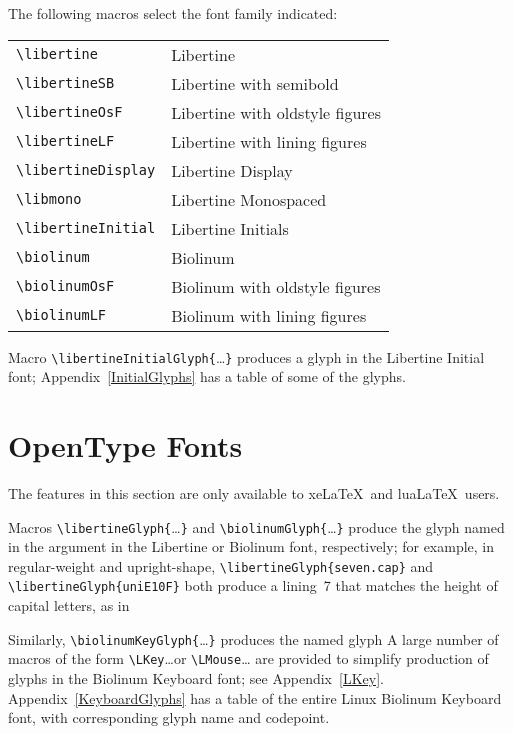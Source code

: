 \documentclass[11pt]{article}
\begin{document}
The following macros select the font family indicated:
\begin{center}
\begin{tabular}{ll}
\verb|\libertine| & Libertine \\
\verb|\libertineSB|& Libertine with semibold \\
\verb|\libertineOsF| & Libertine with oldstyle figures \\
\verb|\libertineLF| & Libertine with lining figures \\
\verb|\libertineDisplay| & Libertine Display \\
\verb|\libmono| & Libertine Monospaced \\
\verb|\libertineInitial| & Libertine Initials \\
\verb|\biolinum| & Biolinum \\
\verb|\biolinumOsF|& Biolinum with oldstyle figures \\
\verb|\biolinumLF| & Biolinum with lining figures \\
\end{tabular}
\end{center}
Macro \verb|\libertineInitialGlyph{|\ldots\verb|}| produces a glyph in the Libertine Initial font;
Appendix~\ref{InitialGlyphs} has a table of some of the glyphs.

\section{OpenType Fonts}
\label{OpenType}

The features in this section are only available to xe\LaTeX\ and lua\LaTeX\ users.

Macros \verb|\libertineGlyph{|\ldots\verb|}| and \verb|\biolinumGlyph{|\ldots\verb|}| produce the
glyph named in the argument in the Libertine or Biolinum font,
respectively; for example, in regular-weight and upright-shape,
\verb|\libertineGlyph{seven.cap}| and \verb|\libertineGlyph{uniE10F}| both produce a
lining~7 that matches the height of capital letters, as in
\begin{list}{}{}\item
\end{list} 
Similarly, \verb|\biolinumKeyGlyph{|\ldots\verb|}| produces the named glyph
A large number of macros of the form \verb|\LKey|\ldots or \verb|\LMouse|\ldots
are provided to simplify production of glyphs in the Biolinum Keyboard font;
see Appendix~\ref{LKey}. Appendix~\ref{KeyboardGlyphs} has a table of the entire
Linux Biolinum Keyboard font, with corresponding glyph name and codepoint.
\end{document}
